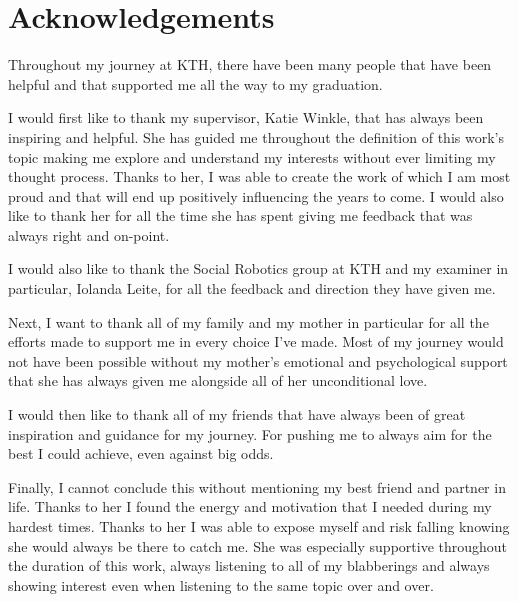 \documentclass[nomenclature, english, biblatex]{kththesis}
\begin{document}

\cleardoublepage


\section*{Acknowledgements}
Throughout my journey at \gls{KTH}, there have been many people that have been helpful and that supported me all the way to my graduation.

I would first like to thank my supervisor, Katie Winkle, that has always been inspiring and helpful. She has guided me throughout the definition of this work's topic making me explore and understand my interests without ever limiting my thought process. Thanks to her, I was able to create the work of which I am most proud and that will end up positively influencing the years to come. I would also like to thank her for all the time she has spent giving me feedback that was always right and on-point.

I would also like to thank the Social Robotics group at \gls{KTH} and my examiner in particular, Iolanda Leite, for all the feedback and direction they have given me.

Next, I want to thank all of my family and my mother in particular for all the efforts made to support me in every choice I've made. Most of my journey would not have been possible without my mother's emotional and psychological support that she has always given me alongside all of her unconditional love.%

I would then like to thank all of my friends that have always been of great inspiration and guidance for my journey. For pushing me to always aim for the best I could achieve, even against big odds.

Finally, I cannot conclude this without mentioning my best friend and partner in life. Thanks to her I found the energy and motivation that I needed during my hardest times. Thanks to her I was able to expose myself and risk falling knowing she would always be there to catch me. She was especially supportive throughout the duration of this work, always listening to all of my blabberings and always showing interest even when listening to the same topic over and over.

\acknowlegmentssignature

\renewcommand{\chaptermark}[1]{ \markboth{#1}{}} 
\tableofcontents
  \markboth{\contentsname}{}
\end{document}
